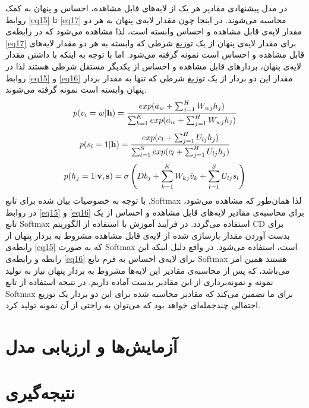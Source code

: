 \documentclass[12pt,a4paper]{article}
\begin{document}
در مدل پیشنهادی مقادیر هر یک از لایه‌های قابل مشاهده، احساس و پنهان به کمک روابط
\ref{eq15}
تا
\ref{eq17}
محاسبه می‌شوند. در اینجا چون مقدار لایه‌ی پنهان به هر دو مقدار لایه‌ی قابل مشاهده و احساس وابسته است، لذا مشاهده می‌‌شود که در رابطه‌ی
\ref{eq17}
برای مقدار لایه‌ی پنهان از یک توزیع شرطی که وابسته به هر دو مقدار لایه‌های قابل مشاهده و احساس است نمونه گرفته می‌‌شود. اما با توجه به اینکه با داشتن مقدار لایه‌ی پنهان، بردارهای قابل مشاهده و احساس از یکدیگر مستقل شرطی هستند لذا در روابط
\ref{eq15}
و
\ref{eq16}
مقدار این دو بردار از یک توزیع شرطی که تنها به مقدار بردار
پنهان وابسته است نمونه گرفته می‌‌شوند.
\begin{align}
\centering
\label{eq15}
p(v_{i}=w|\textbf{h})=\dfrac{exp(a_{w}+\sum_{j=1}^{H}W_{wj}h_j)}{\sum_{k=1}^{K}exp(a_{w}+\sum_{j=1}^{H}W_{wj}h_j)}
\end{align}
\begin{align}
\centering
\label{eq16}
p(s_{l}=1|\textbf{h})=\dfrac{exp(c_{l}+\sum_{j=1}^{H}U_{lj}h_j)}{\sum_{l=1}^{S}exp(c_{l}+\sum_{j=1}^{H}U_{lj}h_j)}
\end{align}
\begin{align}
\centering
\label{eq17}
p(h_{j}=1|\textbf{v},\textbf{s})=\sigma \left( Db_j + \sum_{k=1}^{K}W_{kj}\hat{v}_k + \sum_{l=1}^{S}U_{lj}s_l \right)
\end{align}
با توجه به خصوصیات بیان شده برای تابع ,Softmax لذا همان‌طور که مشاهده می‌‌شود، در روابط
\ref{eq15}
و
\ref{eq16}
برای محاسبه‌ی مقادیر لایه‌های قابل مشاهده و احساس از یک تابع Softmax استفاده می‌‌گردد. در فرآیند آموزش با استفاده از الگوریتم CD
برای بدست آوردن مقدار بازسازی شده از لایه‌ی قابل مشاهده مشروط به بردار پنهان
از رابطه‌ی
\ref{eq15}
که به صورت Softmax است، استفاده می‌‌شود. در واقع دلیل اینکه این رابطه و رابطه‌ی
\ref{eq16}
برای لایه‌ی احساس به فرم تابع Softmax
هستند همین امر می‌‌باشد، که پس از محاسبه‌ی مقادیر این لایه‌ها مشروط به بردار پنهان نیاز به تولید نمونه و نمونه‌برداری از این مقادیر بدست آماده داریم. در نتیجه استفاده از تابع Softmax برای ما تضمین می‌‌کند که مقادیر محاسبه شده برای این دو بردار یک توزیع احتمالی‌ چندجمله‌ای خواهد بود که می‌‌توان به راحتی‌ از آن نمونه تولید کرد.

\section{آزمایش‌ها و ارزیابی مدل}
\section{نتیجه‌گیری}

%
%
\end{document}

